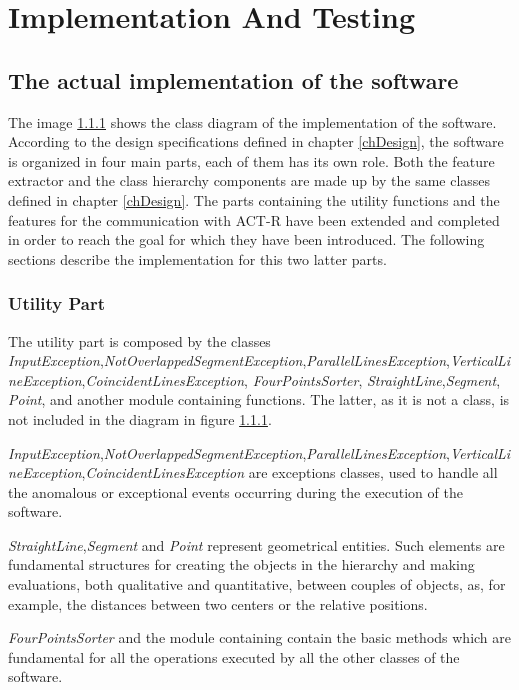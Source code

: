 \chapter{Implementation And Testing}

	\section{The actual implementation of the software}

	The image \ref{} shows the class diagram of the implementation of the software. 
	According to the design specifications defined in chapter \ref{chDesign}, the software is organized in four main parts, each of them has its own role.
	Both the feature extractor and the class hierarchy components are made up by the same classes defined in chapter \ref{chDesign}. 
	The parts containing the utility functions and the features for the communication with \mbox{ACT-R} have been extended and completed in order to reach the goal for which they have been introduced.
	The following sections describe the implementation for this two latter parts.
	
	\subsection{Utility Part}
	The utility part is composed by the classes \emph{InputException},\emph{NotOverlappedSegmentException},\emph{ParallelLinesException},\emph{VerticalLineException},\emph{CoincidentLinesException}, \emph{FourPointsSorter}, \emph{StraightLine},\emph{Segment}, \emph{Point}, and another module containing functions. The latter, as it is not a class, is not included in the diagram in figure \ref{}. 

	\emph{InputException},\emph{NotOverlappedSegmentException},\emph{ParallelLinesException},\emph{VerticalLineException},\emph{CoincidentLinesException} are exceptions classes, used to handle all the anomalous or exceptional events occurring during the execution of the software. 

	\emph{StraightLine},\emph{Segment} and \emph{Point} represent geometrical entities. Such elements are fundamental structures for creating the objects in the hierarchy and making evaluations, both qualitative and quantitative, between couples of objects, as, for example, the distances between two centers or the relative positions.

	\emph{FourPointsSorter} and the module containing contain the basic methods which are fundamental for all the operations executed by all the other classes of the software.


